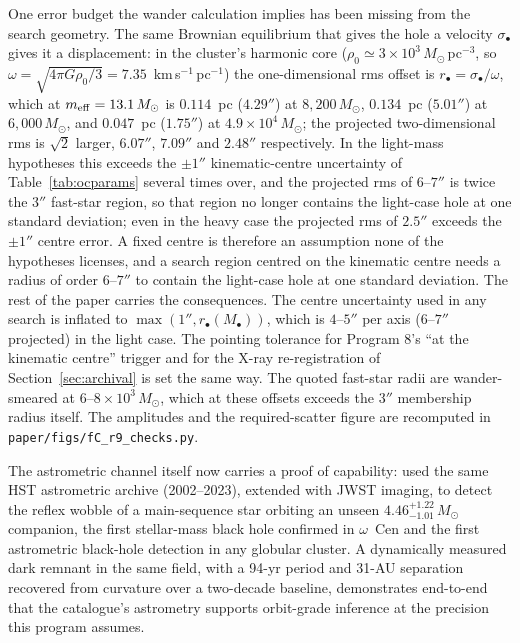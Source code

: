 \documentclass[11pt]{article}
\newcommand{\msun}{\ensuremath{M_\odot}}
\newcommand{\ocen}{\ensuremath{\omega}~Cen}
\begin{document}
One error budget the wander calculation implies has been missing from the search geometry. The same Brownian equilibrium that gives the hole a velocity $\sigma_{\bullet}$ gives it a displacement: in the cluster's harmonic core ($\rho_{0} \simeq 3\times10^{3}\,\msun$\,pc$^{-3}$, so $\omega = \sqrt{4\pi G\rho_{0}/3} = 7.35$~km\,s$^{-1}$\,pc$^{-1}$) the one-dimensional rms offset is $r_{\bullet} = \sigma_{\bullet}/\omega$, which at $m_{\rm eff} = 13.1\,\msun$ is $0.114$~pc ($4.29''$) at $8{,}200\,\msun$, $0.134$~pc ($5.01''$) at $6{,}000\,\msun$, and $0.047$~pc ($1.75''$) at $4.9\times10^{4}\,\msun$; the projected two-dimensional rms is $\sqrt{2}$ larger, $6.07''$, $7.09''$ and $2.48''$ respectively. In the light-mass hypotheses this exceeds the $\pm1''$ kinematic-centre uncertainty of Table~\ref{tab:ocparams} several times over, and the projected rms of $6$--$7''$ is twice the $3''$ fast-star region, so that region no longer contains the light-case hole at one standard deviation; even in the heavy case the projected rms of $2.5''$ exceeds the $\pm1''$ centre error. A fixed centre is therefore an assumption none of the hypotheses licenses, and a search region centred on the kinematic centre needs a radius of order $6$--$7''$ to contain the light-case hole at one standard deviation. The rest of the paper carries the consequences. The centre uncertainty used in any search is inflated to $\max(1'', r_{\bullet}(M_{\bullet}))$, which is $4$--$5''$ per axis ($6$--$7''$ projected) in the light case. The pointing tolerance for Program 8's ``at the kinematic centre'' trigger and for the X-ray re-registration of Section~\ref{sec:archival} is set the same way. The quoted fast-star radii are wander-smeared at $6$--$8\times10^{3}\,\msun$, which at these offsets exceeds the $3''$ membership radius itself. The amplitudes and the required-scatter figure are recomputed in \texttt{paper/figs/fC\_r9\_checks.py}.

The astrometric channel itself now carries a proof of capability: \citet{Whitaker2026BH2} used the same HST astrometric archive (2002--2023), extended with JWST imaging, to detect the reflex wobble of a main-sequence star orbiting an unseen $4.46^{+1.22}_{-1.01}\,\msun$ companion, the first stellar-mass black hole confirmed in \ocen{} and the first astrometric black-hole detection in any globular cluster. A dynamically measured dark remnant in the same field, with a 94-yr period and 31-AU separation recovered from curvature over a two-decade baseline, demonstrates end-to-end that the catalogue's astrometry supports orbit-grade inference at the precision this program assumes.
\end{document}
